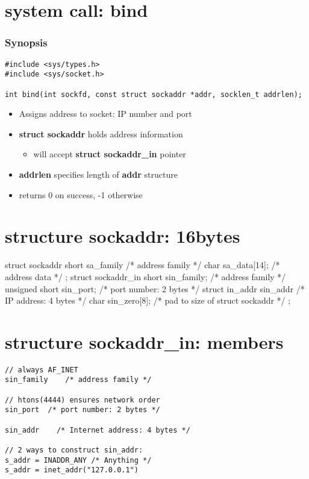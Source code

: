 \documentclass{report}
\begin{document}
\section{system call: bind}
\subsubsection*{Synopsis}
\begin{verbatim}
#include <sys/types.h>
#include <sys/socket.h>

int bind(int sockfd, const struct sockaddr *addr, socklen_t addrlen);
\end{verbatim}
\begin{itemize}
\item Assigns address to socket: IP number and port
\item \textbf{struct sockaddr} holds address information
  \begin{itemize}[label=$\circ$]
    \item will accept \textbf{struct sockaddr\_in} pointer
  \end{itemize}
\item \textbf{addrlen} specifies length of \textbf{addr} structure
\item returns 0 on success, -1 otherwise
\end{itemize}
\section{structure sockaddr: 16bytes}
\begin{cppcode}
  struct sockaddr {
    short sa_family   /* address family */
    char sa_data[14];   /* address data */
  };
  struct sockaddr_in {
    short sin_family;    /* address family */
    unsigned short sin_port;    /* port number: 2 bytes */
    struct in_addr sin_addr     /* IP address: 4 bytes */
    char sin_zero[8]; /* pad to size of struct sockaddr */
  };
\end{cppcode}
\section{structure sockaddr\_in: members}
\begin{verbatim}
// always AF_INET
sin_family    /* address family */

// htons(4444) ensures network order
sin_port  /* port number: 2 bytes */

sin_addr    /* Internet address: 4 bytes */

// 2 ways to construct sin_addr:
s_addr = INADDR_ANY /* Anything */
s_addr = inet_addr("127.0.0.1")
\end{verbatim}
\end{document}
